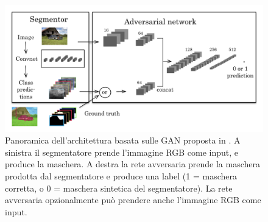 \begin{figure}[h!]
    \centering
    \hspace*{0in}
    \includegraphics[scale=0.55]{img/gan.png}
    \caption{Panoramica dell'architettura basata sulle GAN proposta in \cite{anet}. A sinistra il segmentatore prende l'immagine RGB come input, e produce la maschera. A destra la rete avversaria prende la maschera prodotta dal segmentatore e produce una label (1 = maschera corretta, o 0 = maschera sintetica del segmentatore). La rete avversaria opzionalmente può prendere anche l'immagine RGB come input.}
    \label{fig:anet}
\end{figure}

